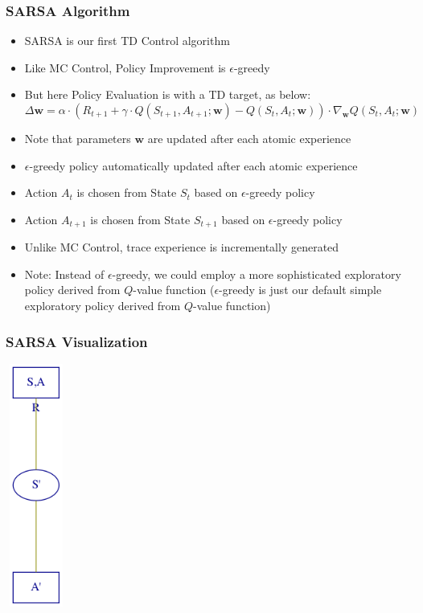 \documentclass[handout]{beamer}
\begin{document}
\begin{frame}
\frametitle{SARSA Algorithm}
\begin{itemize}[<+->]
\item SARSA is our first TD Control algorithm
\item Like MC Control, Policy Improvement is $\epsilon$-greedy
\item But here Policy Evaluation is with a TD target, as below:
$$\Delta \bm{w} =  \alpha \cdot (R_{t+1} + \gamma \cdot Q(S_{t+1}, A_{t+1}; \bm{w}) - Q(S_t,A_t; \bm{w})) \cdot \nabla_{\bm{w}} Q(S_t, A_t; \bm{w})$$
\item Note that parameters $\bm{w}$ are updated after each atomic experience
\item $\epsilon$-greedy policy automatically updated after each atomic experience
\item Action $A_t$ is chosen from State $S_t$ based on $\epsilon$-greedy policy
\item Action $A_{t+1}$ is chosen from State $S_{t+1}$ based on $\epsilon$-greedy policy
\item Unlike MC Control, trace experience is incrementally generated
\item Note: Instead of $\epsilon$-greedy, we could employ a more sophisticated exploratory policy derived from $Q$-value function ($\epsilon$-greedy is just our default simple exploratory policy derived from $Q$-value function)
\end{itemize}
\end{frame}

\begin{frame}
\frametitle{SARSA Visualization}
\centerline{\includegraphics[width=2cm, height=8cm]{sarsa.png}}
\end{frame}
\end{document}
